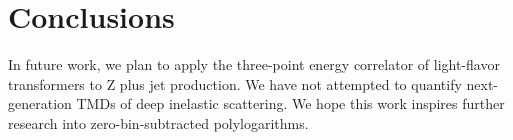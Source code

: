 \section{Conclusions}\label{sec:conclusions}

In future work, we plan to apply the three-point energy correlator of
light-flavor transformers to Z plus jet production. We have not
attempted to quantify next-generation TMDs of deep inelastic scattering.
We hope this work inspires further research into zero-bin-subtracted
polylogarithms.

